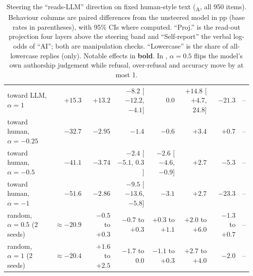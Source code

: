 \begin{table}[t]
{\begin{tabular}{@{}lrrrrrrr@{}}
        toward LLM, $\alpha=1$ & $+15.3$ & $+13.2$ & $-8.2$ [$-12.2$, $-4.1$] & $0.0$ & $+14.8$ [$+4.7$, $24.8$] & $\mathbf{-21.3}$ & -- \\
        toward human, $\alpha=-0.25$ & $-32.7$ & $-2.95$ & $-1.4$ & $-0.6$ & $+3.4$ & $+0.7$ & -- \\
        toward human, $\alpha=-0.5$ & $-41.1$ & $-3.74$ & $-2.4$ [$-5.1$, $0.3$] & $-2.6$ [$-4.6$, $-0.9$] & $+2.7$ & $-5.3$ & -- \\
        toward human, $\alpha=-1$ & $-51.6$ & $-2.86$ & $-9.5$ [$-13.6$, $-5.8$] & $-3.1$ & $+2.7$ & $\mathbf{-23.3}$ & -- \\
        random, $\alpha=0.5$ (2 seeds) & $\approx-20.9$ & $-0.5$ to $+0.3$ & $-0.7$ to $+0.3$ & $+0.3$ to $+1.1$ & $+2.0$ to $+6.0$ & $-1.3$ to $+0.7$ & -- \\
        random, $\alpha=1$ (2 seeds) & $\approx-20.4$ & $+1.6$ to $+2.5$ & $-1.7$ to $0.0$ & $-1.1$ to $+0.3$ & $+2.7$ to $+4.0$ & $-2.0$ & -- \\
        \bottomrule
    \end{tabular}
    }
    \caption{Steering the ``reads-LLM'' direction on fixed human-style text (\vH\textsubscript{A}, all 950 items). Behaviour columns are paired differences from the unsteered model in pp (base rates in parentheses), with 95\% CIs where computed. ``Proj.'' is the read-out projection four layers above the steering band and ``Self-report'' the verbal log-odds of ``AI''; both are manipulation checks. ``Lowercase'' is the share of all-lowercase replies (\llama only). Notable effects in {\bf bold}. In \qwen, $\alpha=0.5$ flips the model's own authorship judgement while refusal, over-refusal and accuracy move by at most 1\pp.}
    \label{tab:steering}
\end{table}
